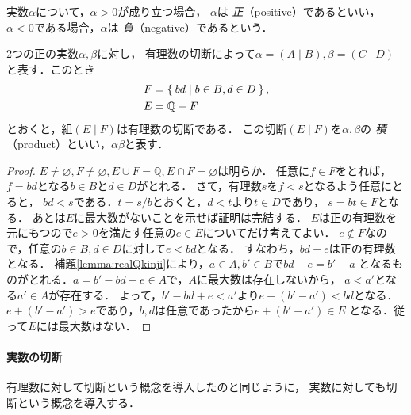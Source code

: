     実数$\alpha$について，$\alpha >0$が成り立つ場合，
    $\alpha$は
    \emph{正}（positive）であるといい，
    $\alpha <0$である場合，$\alpha$は
    \emph{負}（negative）であるという．

    \begin{thm} \label{thm:realproduct}
      2つの正の実数$\alpha ,  \beta$に対し，
      有理数の切断によって$\alpha = (A \mid B) ,  \beta = (C \mid D)$
      と表す．このとき
      \begin{align*}
        F & = \Set{ bd \mid b \in B, d \in D} , \\
        E & = \mathbb{Q} - F
      \end{align*}
      とおくと，組$(E \mid F)$は有理数の切断である．
      この切断$(E \mid F)$を$\alpha ,  \beta$の
      \emph{積}（product）といい，$\alpha \beta$と表す．
    \end{thm}

    \begin{proof}
      $E \neq \varnothing ,  F \neq \varnothing ,  E \cup F = \mathbb{Q} ,  
      E \cap F = \varnothing$は明らか．
      任意に$f \in F$をとれば，$f= bd$となる$b \in B$と$d \in D$がとれる．
      さて，有理数$s$を$f<s$となるよう任意にとると，
      $bd<s$である．$t= s/b$とおくと，$d<t$より$t \in D$であり，
      $s= bt \in F$となる．
      あとは$E$に最大数がないことを示せば証明は完結する．
      $E$は正の有理数を元にもつので$e >0$を満たす任意の$e \in E$についてだけ考えてよい．
      $e \notin F$なので，任意の$b \in B, d \in D$に対して$e<bd$となる．
      すなわち，$bd-e$は正の有理数となる．
      補題\ref{lemma:realQkinji}により，$a \in A,  b' \in B$で$bd - e = b'-a$
      となるものがとれる．$a=b'-bd+e \in A$で，$A$に最大数は存在しないから，
      $a<a'$となる$a' \in A$が存在する．
      よって，$b'-bd+e<a'$より$e+(b'-a')<bd$となる．
      $e+(b'-a')>e$であり，$b,  d$は任意であったから$e+(b'-a') \in E$
      となる．従って$E$には最大数はない．
    \end{proof}

   \paragraph{実数の切断}
    有理数に対して切断という概念を導入したのと同じように，
    実数に対しても切断という概念を導入する．

